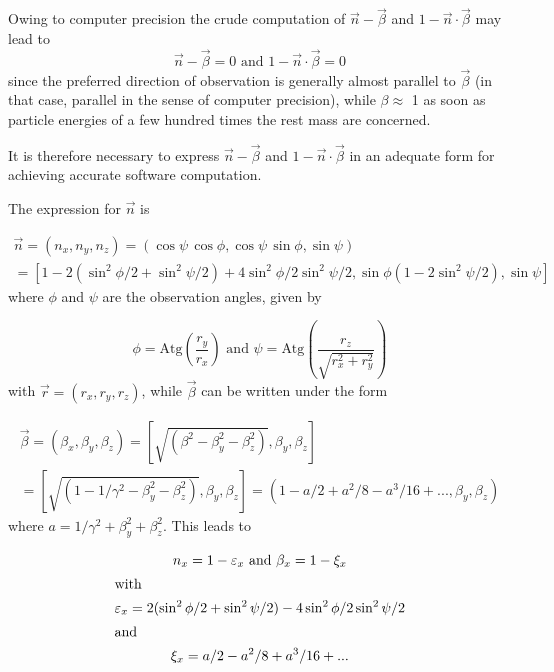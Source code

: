Owing to computer precision the crude computation of $\vec{n} -
\vec{\beta}$ and $ 1 -\vec{n}\cdot \vec{\beta}$ may lead to
$$
	\vec{n} - \vec{\beta} = 0 \text{ and } 1 - \vec{n}\cdot \vec{\beta} = 0
$$
since the preferred direction of observation is generally almost parallel to
$\vec{\beta}$ (in that case, parallel in the sense of computer precision), while $\beta
\approx$ 1 as soon as particle energies of a few hundred times the rest mass are
concerned.

\noindent It is therefore necessary to express $\vec{n} - \vec{\beta}$ 
and $1 -\vec{n} \cdot
\vec{\beta}$ in an adequate  form for achieving accurate software  computation.

\noindent The expression for $\vec{n}$ is

\begin{multline} \label{eqN4.5}
	\vec{n} = (n_x, n_y, n_z) = (\cos \psi\,\cos \phi, \cos \psi \,\sin 
		\phi, \sin \psi)  \\
	= \left[1 - 2 (\sin^2\phi/2 + \sin^2 \psi/2) + 4 \sin^2\phi/2 \sin^2\psi/2, 
		\sin \phi (1 - 2\sin^2\psi/2), \sin \psi \right]
\end{multline}
%
where $\phi$ and $\psi$ are the observation angles, given by 

\begin{equation}
	\phi = \text{Atg} \left( \dfrac{r_y}{ r_x}\right)
	\text{ and }  \psi = \text{Atg}\left( \dfrac{r_z}{\sqrt{r_x^2 + r_y^2}}\right) \label{eqN4.6}
\end{equation} %
%
with $\vec{r} = (r_x, r_y, r_z)$, while $\vec{\beta}$ can be written under the form

\begin{multline} \label{eqN4.7}
	\vec{\beta} = (\beta_x, \beta_y, \beta_z) = 
		\left[ \sqrt{(\beta^2 - \beta^2_y - \beta_z^2)},\beta_y, \beta_z 
		\right] \\
	= \left[ \sqrt{(1 - 1/\gamma^2 - \beta_y^2 - \beta_z^2)}, \beta_y, 
		\beta_z \right] = (1 - a/2 + a^2/8 - a^3/16 +...,\beta_y, \beta_z) 
\end{multline}
%
where $a = 1/ \gamma^2 + \beta^2_y + \beta^2_z$. This leads to

\begin{gather*}
	n_x = 1 - \varepsilon_x 
		\text{ and } \beta_x = 1 - \xi_x  \\
\intertext{with}
\varepsilon_x = 2 (\sin^2\phi/2 + \sin^2\psi/2) - 4 \sin^2\phi/2  \sin^2\psi/2 \\
\intertext{and}
\xi_x = a/2 - a^2/8 + a^3/16 +...
\end{gather*}

